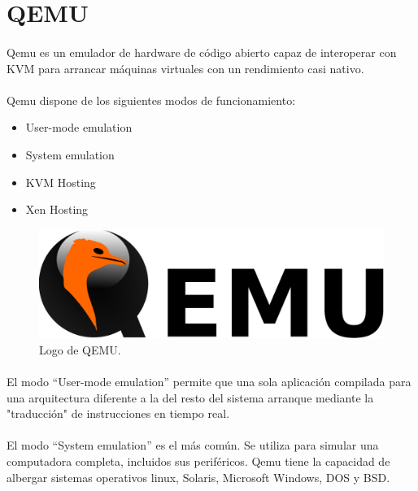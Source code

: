 \section{QEMU}\label{sec:qemu}

\paragraph{}Qemu es un emulador de hardware de código abierto capaz de interoperar con
\gls{KVM} para arrancar máquinas virtuales con un rendimiento casi nativo.
\cite{qemu}

\paragraph{}Qemu dispone de los siguientes modos de funcionamiento:

\begin{itemize}
	\item User-mode emulation
	\item System emulation
	\item \gls{KVM} Hosting
	\item Xen Hosting
\end{itemize}

\begin{figure}[h]
	\centering
	\includegraphics[width=0.50\linewidth]{imgs/qemu-logo}
	\caption[Qemu Logo]{Logo de QEMU.}
	\label{fig:qemu}
\end{figure}

\paragraph{} El modo ``User-mode emulation'' permite que una sola aplicación compilada
para una arquitectura diferente a la del resto del sistema arranque mediante la "traducción"
de instrucciones en tiempo real.

\paragraph{} El modo ``System emulation'' es el más común. Se utiliza para simular una
computadora completa, incluidos sus periféricos. Qemu tiene la capacidad de albergar
sistemas operativos linux, Solaris, Microsoft Windows, DOS y BSD.

